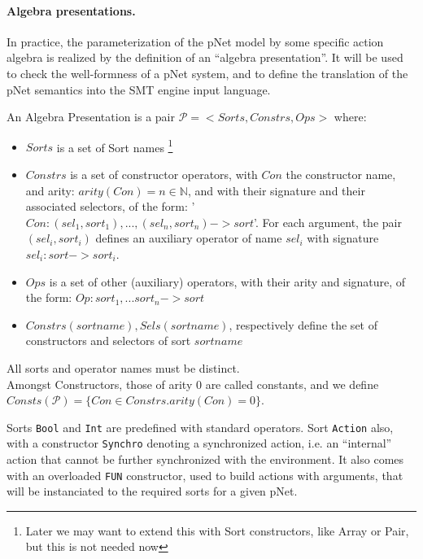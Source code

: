 \documentclass{lncs/llncs}
\begin{document}
\paragraph*{Algebra presentations.}
In practice, the parameterization of the pNet model by some specific
action algebra is realized by the definition of an ``algebra
presentation''. It will be used to check the
well-formness of a pNet system, and to define the translation of the pNet
semantics into the SMT engine input language.

\begin{definition}
  An Algebra Presentation is a pair $\mathcal{P}=<Sorts,Constrs,Ops>$ where:

  \begin{itemize}
  \item $Sorts$ is a set of Sort names
    \footnote{Later we may want to extend this with Sort constructors,
      like Array or Pair, but this is not needed now}
  \item $Constrs$ is a set of constructor operators, with $Con$ the
    constructor name, and arity: $arity(Con)=n \in \mathbb{N}$,
    and with their signature and their associated selectors,
    of the form: '$Con : (sel_1,sort_1), ... , (sel_n,sort_n) -> sort$'.
    For each argument, the pair $(sel_i,sort_i)$ defines an auxiliary
    operator of name $sel_i$ with signature $sel_i : sort -> sort_i$.
    \item $Ops$ is a set of other (auxiliary) operators, with their
      arity and signature, of the form: $Op : sort_1, ...  sort_n ->
      sort$
      \item $Constrs(sortname), Sels(sortname)$, respectively define the set of
        constructors and selectors of sort $sortname$
  \end{itemize}
  All sorts and operator names must be distinct.\\
  Amongst Constructors, those of arity 0 are called constants, and we
  define $Consts(\mathcal{P}) = \{Con \in Constrs. arity(Con)=0\}$.
\end{definition}

Sorts \texttt{Bool} and \texttt{Int} are predefined with standard operators.
Sort \texttt{Action} also, with a constructor \texttt{Synchro} denoting
a synchronized action, i.e. an ``internal'' action that cannot be
further synchronized with the environment. It also comes with an
overloaded \texttt{FUN} constructor, used to build actions with
arguments, that will be instanciated to the required sorts for a given
pNet.
\end{document}
